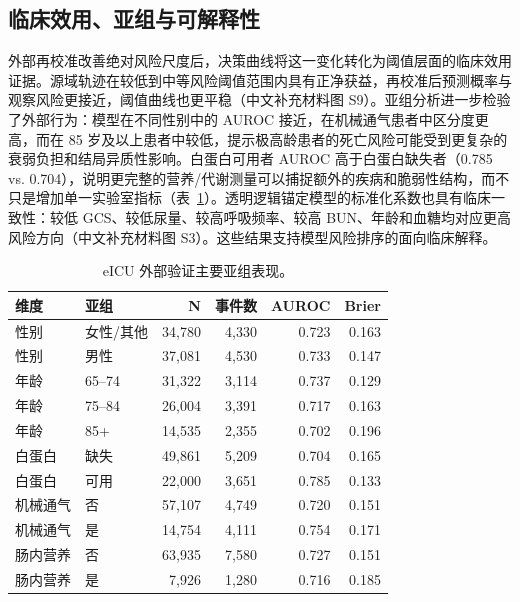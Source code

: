 \documentclass[11pt]{ctexart}
\begin{document}
\begin{table}[htbp]
\centering
\caption{主要模型性能及 bootstrap 置信区间。}
\label{tab:primary}
\noindent{}
\end{table}

\subsection{临床效用、亚组与可解释性}
外部再校准改善绝对风险尺度后，决策曲线将这一变化转化为阈值层面的临床效用证据。源域轨迹在较低到中等风险阈值范围内具有正净获益，再校准后预测概率与观察风险更接近，阈值曲线也更平稳（中文补充材料图 S9）。亚组分析进一步检验了外部行为：模型在不同性别中的 AUROC 接近，在机械通气患者中区分度更高，而在 85 岁及以上患者中较低，提示极高龄患者的死亡风险可能受到更复杂的衰弱负担和结局异质性影响。白蛋白可用者 AUROC 高于白蛋白缺失者（0.785 vs. 0.704），说明更完整的营养/代谢测量可以捕捉额外的疾病和脆弱性结构，而不只是增加单一实验室指标（表~\ref{tab:subgroup}）。透明逻辑锚定模型的标准化系数也具有临床一致性：较低 GCS、较低尿量、较高呼吸频率、较高 BUN、年龄和血糖均对应更高风险方向（中文补充材料图 S3）。这些结果支持模型风险排序的面向临床解释。

\begin{table}[htbp]
\centering
\caption{eICU 外部验证主要亚组表现。}
\label{tab:subgroup}
\begin{tabular}{llrrrr}
\toprule
维度 & 亚组 & N & 事件数 & AUROC & Brier\\
\midrule
性别 & 女性/其他 & 34,780 & 4,330 & 0.723 & 0.163\\
性别 & 男性 & 37,081 & 4,530 & 0.733 & 0.147\\
年龄 & 65--74 & 31,322 & 3,114 & 0.737 & 0.129\\
年龄 & 75--84 & 26,004 & 3,391 & 0.717 & 0.163\\
年龄 & 85+ & 14,535 & 2,355 & 0.702 & 0.196\\
白蛋白 & 缺失 & 49,861 & 5,209 & 0.704 & 0.165\\
白蛋白 & 可用 & 22,000 & 3,651 & 0.785 & 0.133\\
机械通气 & 否 & 57,107 & 4,749 & 0.720 & 0.151\\
机械通气 & 是 & 14,754 & 4,111 & 0.754 & 0.171\\
肠内营养 & 否 & 63,935 & 7,580 & 0.727 & 0.151\\
肠内营养 & 是 & 7,926 & 1,280 & 0.716 & 0.185\\
\bottomrule
\end{tabular}
\end{table}
\end{document}
